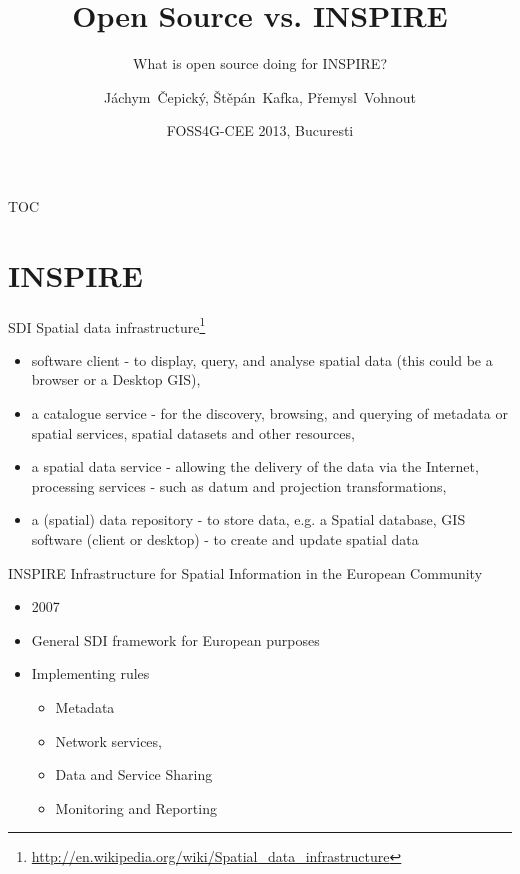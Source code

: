 \documentclass[xcolor=dvipsnames]{beamer}
\title[Open Source] %
{Open Source vs. INSPIRE}
\subtitle {What is open source doing for INSPIRE?}
\author[J. Čepický] %
{Jáchym~Čepický\inst{1}, Štěpán~Kafka\inst{1}, Přemysl~Vohnout\inst{2}}
\institute %
{
  \inst{1}%
  Help Service - Remote Sensing s.r.o. \\
  Benešov\\
  \url{http://hsrs.cz}\\

  \inst{2}%
  Czech Center for Science and Society\\
  Prague\\
  \url{http://ccss.cz}\\
}
\date[] %
{FOSS4G-CEE 2013, Bucuresti}
\begin{document}
\begin{frame}
  \titlepage
\end{frame}

\begin{frame}{TOC}
  \tableofcontents
\end{frame}

\section{INSPIRE}

\begin{frame}{SDI}
Spatial data infrastructure\footnote{\url{http://en.wikipedia.org/wiki/Spatial_data_infrastructure}}
\begin{itemize} 
    \item software client - to display, query, and analyse spatial data (this could be a browser or a Desktop GIS),
    \item a catalogue service - for the discovery, browsing, and querying of metadata or spatial services, spatial datasets and other resources,
    \item a spatial data service - allowing the delivery of the data via the Internet, processing services - such as datum and projection transformations,
    \item a (spatial) data repository - to store data, e.g. a Spatial database, GIS software (client or desktop) - to create and update spatial data
\end{itemize}
\end{frame}

\begin{frame}{INSPIRE}
Infrastructure for Spatial Information in the European Community
\begin{itemize} 
    \item 2007
    \item General SDI framework for European purposes
    \item Implementing rules 
        \begin{itemize}
            \item Metadata
            \item Network services,
            \item Data and Service Sharing
            \item Monitoring and Reporting
        \end{itemize}
\end{itemize}
\end{frame}
\end{document}

